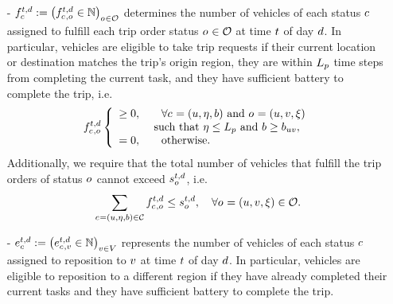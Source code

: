 \begin{itemize}
    \item[-] \emph{$f^{t,d}_{c_{}} := \left(f^{t,d}_{c_{}, o_{}} \in \mathbb{N} \right)_{o_{} \in \mathcal{O}}$} determines the number of vehicles of each status $c_{}$ assigned to fulfill each trip order status $o_{}\in \mathcal{O}$ at time $t$ of day $d$. In particular, vehicles are eligible to take trip requests if their current location or destination matches the trip's origin region, they are within $L_p$ time steps from completing the current task, and they have sufficient battery to complete the trip, i.e.  %
    \begin{align} \label{eq:setup-passenger-carrying-flow}
        f^{t,d}_{c_{}, o_{}} \left\{
        \begin{array}{ll}
            \geq 0, & \quad \text{$\forall c_{} = (u, \eta, b)$ and $o_{} = (u, v, \xi)$}\\
            &\text{ such that $\eta \leq L_p$ and 
            $b \geq b_{uv}$}, \\
            = 0, & \quad \text{otherwise.}
        \end{array}
        \right.
    \end{align}
    Additionally, we require that the total number of vehicles that fulfill the trip orders of status $o_{}$ cannot exceed $s_{o_{}}^{t, d}$, i.e. 
    \begin{equation} \label{eq:setup-trip-fulfill-cap}
        \sum_{c_{} = (u, \eta, b) \in \mathcal{C}} f^{t,d}_{c_{}, o_{}} \leq s_{o_{}}^{t, d},\quad \forall o_{} = (u, v, \xi) \in \mathcal{O}.
    \end{equation}
    \item[-] \emph{$e^{t,d}_{c_{}} := \left(e^{t,d}_{c_{}, v} \in \mathbb{N} \right)_{v \in V}$} represents the number of vehicles of each status $c_{}$ assigned to reposition to $v$ at time $t$ of day $d$. In particular, vehicles are eligible to reposition to a different region if they have already completed their current tasks and they have sufficient battery to complete the trip. 

\end{itemize}
